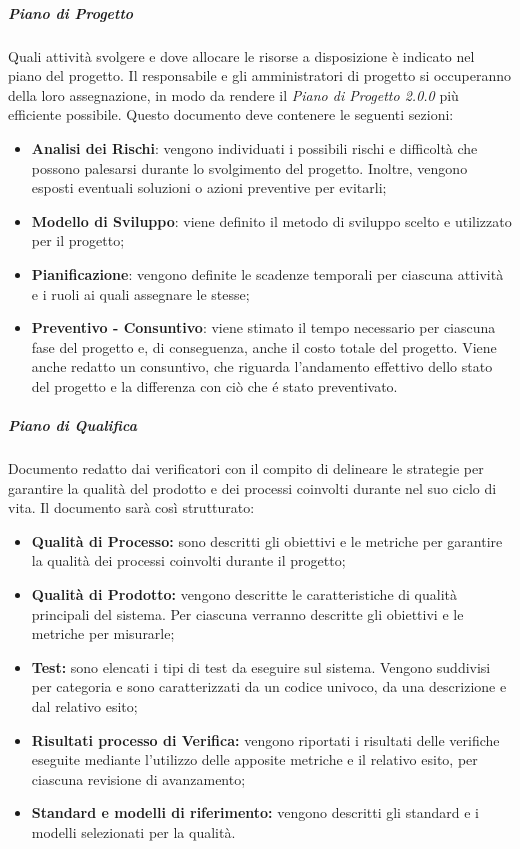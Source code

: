 \subparagraph*{Piano di Progetto}
Quali attività svolgere e dove allocare le risorse a disposizione è indicato nel piano del progetto. Il responsabile e gli amministratori di progetto si occuperanno della loro assegnazione, in modo da rendere il \textit{Piano di Progetto 2.0.0\doc} più efficiente possibile. Questo documento deve contenere le seguenti sezioni:
\begin{itemize}
	\item \textbf{Analisi dei Rischi}: vengono individuati i possibili rischi e difficoltà che possono palesarsi durante lo svolgimento del progetto. Inoltre, vengono esposti eventuali soluzioni o azioni preventive per evitarli;
	\item \textbf{Modello di Sviluppo}: viene definito il metodo di sviluppo scelto e utilizzato per il progetto;
	\item \textbf{Pianificazione}: vengono definite le scadenze temporali per ciascuna attività e i ruoli ai quali assegnare le stesse;
	\item \textbf{Preventivo - Consuntivo}: viene stimato il tempo necessario per ciascuna fase del progetto e, di conseguenza, anche il costo totale del progetto. Viene anche redatto un consuntivo, che riguarda l'andamento effettivo dello stato del progetto e la differenza con ciò che é stato preventivato.
\end{itemize}
\subparagraph*{Piano di Qualifica}
Documento redatto dai verificatori con il compito di delineare le strategie per garantire la qualità del prodotto e dei processi coinvolti durante nel suo ciclo di vita. Il documento sarà così strutturato:
\begin{itemize}
	\item \textbf{Qualità di Processo:} sono descritti gli obiettivi e le metriche per garantire la qualità dei processi coinvolti durante il progetto;
	\item \textbf{Qualità di Prodotto:} vengono descritte le caratteristiche di qualità principali del sistema. Per ciascuna verranno descritte gli obiettivi e le metriche per misurarle;
	\item \textbf{Test:} sono elencati i tipi di test da eseguire sul sistema. Vengono suddivisi per categoria e sono caratterizzati da un codice univoco, da una descrizione e dal relativo esito;
	\item \textbf{Risultati processo di Verifica:} vengono riportati i risultati delle verifiche eseguite mediante l'utilizzo delle apposite metriche e il relativo esito, per ciascuna revisione di avanzamento;
	\item \textbf{Standard e modelli di riferimento:} vengono descritti gli standard e i modelli selezionati per la qualità.
\end{itemize}

